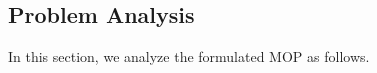 \documentclass[10pt,journal,compsoc]{IEEEtran}
\newtheorem{lemma}{Lemma}
\begin{document}
\subsection{Problem Analysis}

\par In this section, we analyze the formulated MOP as follows.

\end{document}
